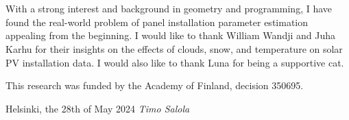 \hypertarget{prefacepage}{}
%
\section*{\prefacename}
With a strong interest and background in geometry and programming, I have found the real-world problem of panel installation parameter estimation appealing from the beginning. I would like to thank William Wandji and Juha Karhu for their insights on the effects of clouds, snow, and temperature on solar PV installation data. I would also like to thank Luna for being a supportive cat.


\vspace{3mm}
\noindent This research was funded by the Academy of Finland, decision 350695.


\vspace{9mm}
\noindent
Helsinki, the 28th of May 2024 %
%
%
\vspace{11mm}
\hspace{1.6cm}\emph{Timo Salola}

\vfill















